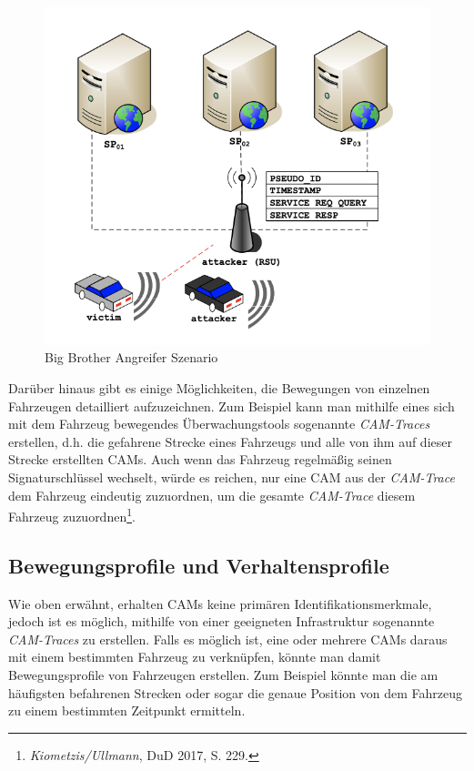 \begin{figure}
	\centering
	\includegraphics[width=0.7\linewidth]{images/big-brother}
	\caption[Big Brother Angreifer Szenario]{Big Brother Angreifer Szenario\nocite{SernaOlvera}\footnotemark}
	\label{fig:bigbro}
\end{figure}

Darüber hinaus gibt es einige Möglichkeiten, die Bewegungen von einzelnen Fahrzeugen detailliert aufzuzeichnen. Zum Beispiel kann man mithilfe eines sich mit dem Fahrzeug bewegendes Überwachungstools sogenannte \textit{CAM-Traces} erstellen, d.h. die gefahrene Strecke eines Fahrzeugs und alle von ihm auf dieser Strecke erstellten CAMs. Auch wenn das Fahrzeug regelmäßig seinen Signaturschlüssel wechselt, würde es reichen, nur eine CAM aus der \textit{CAM-Trace} dem Fahrzeug eindeutig zuzuordnen, um die gesamte \textit{CAM-Trace} diesem Fahrzeug zuzuordnen\footnote{\emph{Kiometzis/Ullmann}, DuD 2017, S. 229.}\nocite{Kiometzis2017}. 

\subsection{Bewegungsprofile und Verhaltensprofile}
\label{sec:SecondContentSection:SecondSubsection:FirstSubSubsection}

Wie oben erwähnt, erhalten CAMs keine primären Identifikationsmerkmale, jedoch ist es möglich, mithilfe von einer geeigneten Infrastruktur sogenannte \textit{CAM-Traces} zu erstellen. Falls es möglich ist, eine oder mehrere CAMs daraus mit einem bestimmten Fahrzeug zu verknüpfen, könnte man damit Bewegungsprofile von Fahrzeugen erstellen. Zum Beispiel könnte man die am häufigsten befahrenen Strecken oder sogar die genaue Position von dem Fahrzeug zu einem bestimmten Zeitpunkt ermitteln. 

